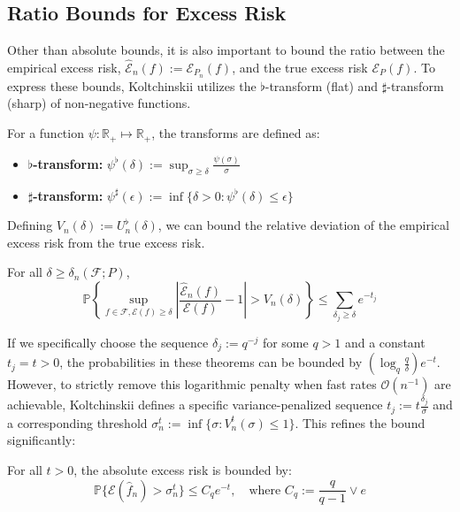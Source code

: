 \subsection{Ratio Bounds for Excess Risk}
Other than absolute bounds, it is also important to bound the ratio between the empirical excess risk, $\hat{\mathcal{E}}_n(f) := \mathcal{E}_{P_n}(f)$, and the true excess risk $\mathcal{E}_P(f)$. To express these bounds, Koltchinskii utilizes the $\flat$-transform (flat) and $\sharp$-transform (sharp) of non-negative functions.

For a function $\psi : \mathbb{R}_+ \mapsto \mathbb{R}_+$, the transforms are defined as:
\begin{itemize}
  \item \textbf{$\flat$-transform:} $\psi^{\flat}(\delta) := \sup_{\sigma \ge \delta} \frac{\psi(\sigma)}{\sigma}$
  \item \textbf{$\sharp$-transform:} $\psi^{\sharp}(\epsilon) := \inf\{\delta > 0 : \psi^{\flat}(\delta) \le \epsilon\}$
\end{itemize}

Defining $V_n(\delta) := U_n^{\flat}(\delta)$, we can bound the relative deviation of the empirical excess risk from the true excess risk.

\vspace{0.5em}
\begin{theorem}\label{thm:ratio_bounds}
  For all $\delta \ge \delta_n(\mathcal{F}; P)$,
  \[
    \mathbb{P}\left\{\sup_{f\in\mathcal{F}, \mathcal{E}(f) \ge \delta} \left|\frac{\hat{\mathcal{E}}_n(f)}{\mathcal{E}(f)} - 1\right| > V_n(\delta)\right\} \le \sum_{\delta_j \ge \delta} e^{-t_j}
  \]
\end{theorem}

If we specifically choose the sequence $\delta_j := q^{-j}$ for some $q > 1$ and a constant $t_j = t > 0$, the probabilities in these theorems can be bounded by $(\log_q \frac{q}{\delta})e^{-t}$. However, to strictly remove this logarithmic penalty when fast rates $\mathcal{O}(n^{-1})$ are achievable, Koltchinskii defines a specific variance-penalized sequence $t_j := t\frac{\delta_j}{\sigma}$ and a corresponding threshold $\sigma_n^t := \inf\{\sigma : V_n^t(\sigma) \le 1\}$. This refines the bound significantly:

\vspace{0.5em}
\begin{theorem}
  For all $t > 0$, the absolute excess risk is bounded by:
  \[
    \mathbb{P}\{\mathcal{E}(\hat{f}_n) > \sigma_n^t\} \le C_q e^{-t}, \quad \text{where } C_q := \frac{q}{q-1} \vee e
  \]
\end{theorem}

